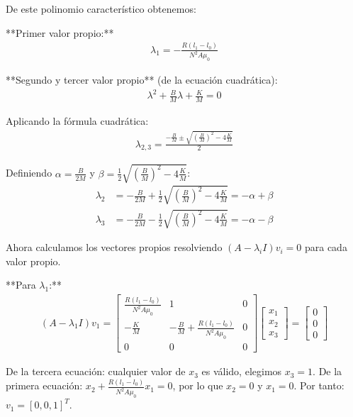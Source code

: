 \documentclass[
  11pt,
  letterpaper,
   addpoints,
   answers
  ]{exam}
\begin{document}
\begin{solution}
De este polinomio característico obtenemos:

**Primer valor propio:**
\begin{align}
\lambda_1 = -\frac{R(l_1 - l_0)}{N^2 A \mu_0}
\end{align}

**Segundo y tercer valor propio** (de la ecuación cuadrática):
\begin{align}
\lambda^2 + \frac{B}{M}\lambda + \frac{K}{M} = 0
\end{align}

Aplicando la fórmula cuadrática:
\begin{align}
\lambda_{2,3} = \frac{-\frac{B}{M} \pm \sqrt{\left(\frac{B}{M}\right)^2 - 4\frac{K}{M}}}{2}
\end{align}

Definiendo $\alpha = \frac{B}{2M}$ y $\beta = \frac{1}{2}\sqrt{\left(\frac{B}{M}\right)^2 - 4\frac{K}{M}}$:
\begin{align}
\lambda_2 &= -\frac{B}{2M} + \frac{1}{2}\sqrt{\left(\frac{B}{M}\right)^2 - 4\frac{K}{M}} = -\alpha + \beta\\
\lambda_3 &= -\frac{B}{2M} - \frac{1}{2}\sqrt{\left(\frac{B}{M}\right)^2 - 4\frac{K}{M}} = -\alpha - \beta
\end{align}

Ahora calculamos los vectores propios resolviendo $(A - \lambda_i I)v_i = 0$ para cada valor propio.

**Para $\lambda_1$:**
\begin{align}
(A - \lambda_1 I)v_1 = \begin{bmatrix}
\frac{R(l_1 - l_0)}{N^2 A \mu_0} & 1 & 0 \\
-\frac{K}{M} & -\frac{B}{M} + \frac{R(l_1 - l_0)}{N^2 A \mu_0} & 0 \\
0 & 0 & 0
\end{bmatrix} \begin{bmatrix} x_1 \\ x_2 \\ x_3 \end{bmatrix} = \begin{bmatrix} 0 \\ 0 \\ 0 \end{bmatrix}
\end{align}

De la tercera ecuación: cualquier valor de $x_3$ es válido, elegimos $x_3 = 1$.
De la primera ecuación: $x_2 + \frac{R(l_1 - l_0)}{N^2 A \mu_0} x_1 = 0$, por lo que $x_2 = 0$ y $x_1 = 0$.
Por tanto: $v_1 = [0, 0, 1]^T$.


\end{solution}
\end{document}
